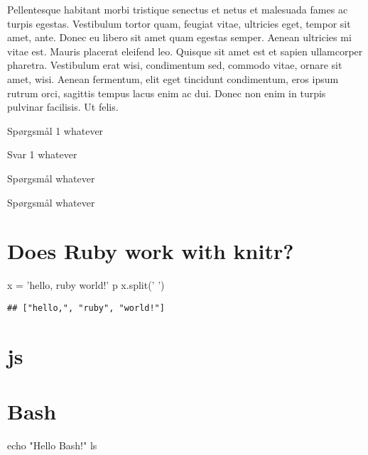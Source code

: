 \documentclass[]{book}
\newenvironment{Shaded}{\begin{snugshade}}{\end{snugshade}}
\newcommand{\BuiltInTok}[1]{#1}
\newcommand{\CharTok}[1]{\textcolor[rgb]{0.31,0.60,0.02}{#1}}
\newcommand{\FunctionTok}[1]{\textcolor[rgb]{0.00,0.00,0.00}{#1}}
\newcommand{\NormalTok}[1]{#1}
\newcommand{\StringTok}[1]{\textcolor[rgb]{0.31,0.60,0.02}{#1}}
\theoremstyle{definition}
\theoremstyle{definition}
\theoremstyle{definition}
\theoremstyle{remark}
\begin{document}
Pellentesque habitant morbi tristique senectus et netus et malesuada
fames ac turpis egestas. Vestibulum tortor quam, feugiat vitae,
ultricies eget, tempor sit amet, ante. Donec eu libero sit amet quam
egestas semper. Aenean ultricies mi vitae est. Mauris placerat eleifend
leo. Quisque sit amet est et sapien ullamcorper pharetra. Vestibulum
erat wisi, condimentum sed, commodo vitae, ornare sit amet, wisi. Aenean
fermentum, elit eget tincidunt condimentum, eros ipsum rutrum orci,
sagittis tempus lacus enim ac dui. Donec non enim in turpis pulvinar
facilisis. Ut felis.

Spørgsmål 1 whatever

Svar 1 whatever

Spørgsmål whatever

Spørgsmål whatever

\hypertarget{does-ruby-work-with-knitr}{%
\section{\texorpdfstring{Does Ruby work with
\textbf{knitr}?}{Does Ruby work with knitr?}}\label{does-ruby-work-with-knitr}}

\begin{Shaded}
\begin{Highlighting}[]
\NormalTok{x = }\StringTok{'hello, ruby world!'}
\NormalTok{p x.split(}\CharTok{' '}\NormalTok{)}
\end{Highlighting}
\end{Shaded}

\begin{verbatim}
## ["hello,", "ruby", "world!"]
\end{verbatim}

\hypertarget{js}{%
\section{js}\label{js}}

\hypertarget{bash}{%
\section{Bash}\label{bash}}

\begin{Shaded}
\begin{Highlighting}[]
\BuiltInTok{echo} \StringTok{"Hello Bash!"}
\FunctionTok{ls}
\end{Highlighting}
\end{Shaded}
\end{document}
